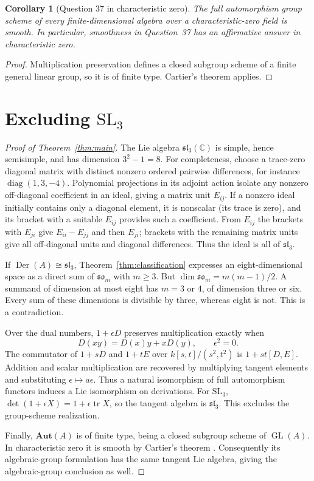 \documentclass[11pt]{article}
\newtheorem{corollary}[theorem]{Corollary}
\DeclareMathOperator{\Der}{Der}
\DeclareMathOperator{\tr}{tr}
\DeclareMathOperator{\GL}{GL}
\newcommand{\so}{\mathfrak{so}}
\newcommand{\slie}{\mathfrak{sl}}
\newcommand{\C}{\mathbb C}
\newcommand{\AutS}{\mathbf{Aut}}
\begin{document}
\begin{corollary}[Question 37 in characteristic zero]\label{cor:smooth}
The full automorphism group scheme of every finite-dimensional algebra
over a characteristic-zero field is smooth. In particular, smoothness
in Question~37 has an affirmative answer in characteristic zero.
\end{corollary}
\begin{proof}
Multiplication preservation defines a closed subgroup scheme of a finite
general linear group, so it is of finite type. Cartier's theorem
\cite[Theorem~3.23 and Corollary~11.31(a)]{milne} applies.
\end{proof}

\section{Excluding \texorpdfstring{$\mathrm{SL}_3$}{SL3}}
\begin{proof}[Proof of Theorem~\ref{thm:main}]
The Lie algebra $\slie_3(\C)$ is simple, hence semisimple, and has dimension
$3^2-1=8$. For completeness, choose a trace-zero diagonal matrix with distinct
nonzero ordered pairwise differences, for instance $\operatorname{diag}(1,3,-4)$.
Polynomial projections in its adjoint action isolate any nonzero
off-diagonal coefficient in an ideal, giving a matrix unit $E_{ij}$.
If a nonzero ideal initially contains only a diagonal element, it is
nonscalar (its trace is zero), and its bracket with a suitable $E_{ij}$
provides such a coefficient. From $E_{ij}$ the brackets with $E_{ji}$ give
$E_{ii}-E_{jj}$ and then $E_{ji}$; brackets with the remaining matrix units
give all off-diagonal units and diagonal differences. Thus the ideal is all
of $\slie_3$.

If $\Der(A)\cong\slie_3$, Theorem~\ref{thm:classification} expresses an
eight-dimensional space as a direct sum of $\so_m$ with $m\ge3$.
But $\dim\so_m=m(m-1)/2$. A summand of dimension at most eight has
$m=3$ or $4$, of dimension three or six. Every sum of these dimensions is
divisible by three, whereas eight is not. This is a contradiction.

Over the dual numbers, $1+\epsilon D$ preserves multiplication exactly when
\[
 D(xy)=D(x)y+xD(y),\qquad \epsilon^2=0.
\]
The commutator of $1+sD$ and $1+tE$ over
$k[s,t]/(s^2,t^2)$ is $1+st[D,E]$.
Addition and scalar multiplication are recovered by multiplying tangent
elements and substituting $\epsilon\mapsto a\epsilon$.
Thus a natural isomorphism of full automorphism functors induces a Lie
isomorphism on derivations. For $\mathrm{SL}_3$,
$\det(1+\epsilon X)=1+\epsilon\tr X$, so the tangent algebra is $\slie_3$.
This excludes the group-scheme realization.

Finally, $\AutS(A)$ is of finite type, being a closed subgroup scheme of
$\GL(A)$. In characteristic zero it is smooth by Cartier's theorem
\cite[Theorem~3.23 and Corollary~11.31(a)]{milne}.
Consequently its algebraic-group formulation has the same tangent Lie
algebra, giving the algebraic-group conclusion as well.
\end{proof}
\end{document}
